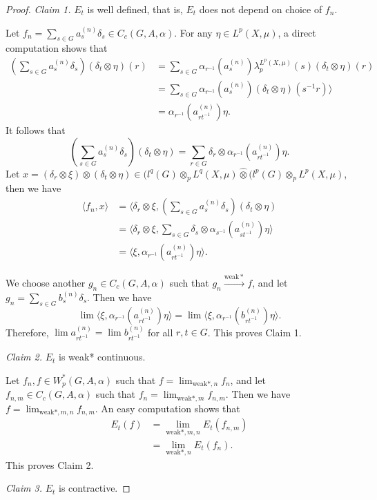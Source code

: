 \documentclass[reqno,11pt]{amsart}
\theoremstyle{plain}
\theoremstyle{definition}
\theoremstyle{remark}
\newcommand{\la}{\langle}
\newcommand{\ra}{\rangle}
\begin{document}
\begin{proof}
{\it Claim 1.} $E_t$ is well defined, that is, $E_t$ does not depend on choice of $f_n$.

Let $f_n=\sum_{s\in G}a_s^{(n)}\delta_s\in C_c(G,A,\alpha)$.
For any $\eta\in L^p(X,\mu)$, a direct computation shows that
$$\begin{aligned} (\sum_{s\in G} a_s^{(n)}\delta_s)(\delta_t\otimes \eta)(r)
 &=\sum_{s\in G}\alpha_{r^{-1}}(a_s^{(n)})\lambda_p^{L^p(X,\mu)}(s)(\delta_t\otimes \eta)(r)\\
 &=\sum_{s\in G} \alpha_{r^{-1}}(a_s^{(n)}) (\delta_t\otimes \eta)(s^{-1}r)  \ra\\
 &=\alpha_{r^{-1}}(a_{rt^{-1}}^{(n)})\eta.\end{aligned}$$
It follows that $$(\sum_{s\in G} a_s^{(n)}\delta_s)(\delta_t\otimes \eta)=\sum_{r\in G}\delta_r\otimes \alpha_{r^{-1}}(a_{rt^{-1}}^{(n)})\eta.$$
Let $x=(\delta_r\otimes\xi)\otimes (\delta_t\otimes \eta)\in (l^q(G)\otimes_p L^q(X,\mu)\widehat{\otimes}(l^p(G)\otimes_p L^p(X,\mu)$, then we have
$$\begin{aligned} \la f_n,x\ra
 &=\la \delta_r\otimes \xi,(\sum_{s\in G}a_s^{(n)}\delta_s)(\delta_t\otimes\eta)\\
 &=\la \delta_r\otimes\xi,\sum_{s\in G}\delta_s\otimes \alpha_{s^{-1}}(a^{(n)}_{st^{-1}})\eta   \ra\\
 &=\la \xi,\alpha_{r^{-1}}(a^{(n)}_{rt^{-1}})\eta \ra. \end{aligned}$$


We choose another $g_n\in C_c(G,A,\alpha)$ such that $g_n\xrightarrow{\mathrm{weak}*}f$,  and let $g_n=\sum_{s\in G}b_s^{(n)}\delta_s$. Then we have
$$\lim\la \xi,\alpha_{r^{-1}}(a^{(n)}_{rt^{-1}})\eta \ra=\lim\la \xi, \alpha_{r^{-1}}(b^{(n)}_{rt^{-1}})\eta \ra.$$
Therefore, $\lim a^{(n)}_{rt^{-1}}=\lim b^{(n)}_{rt^{-1}}$ for all $r,t\in G$. This proves Claim 1.

{\it Claim 2.} $E_t$ is weak* continuous.

Let $f_n,f\in W^*_p(G,A,\alpha)$ such that $f=\lim_{\mathrm{weak}*,n} f_n$, and let $f_{n,m}\in C_c(G,A,\alpha)$ such that $f_n=\lim_{\mathrm{weak}*,m}f_{n,m}$. Then we have $f=\lim_{\mathrm{weak}*,m,n}f_{n,m}$. An easy computation shows that
$$\begin{aligned} E_t(f)
 &=\lim_{\mathrm{weak}*,m,n}E_t(f_{n,m})\\
 &=\lim_{\mathrm{weak}*,n}E_t(f_n). \end{aligned}$$
This proves Claim 2.

{\it Claim 3.} $E_t$ is contractive.


\end{proof}
\end{document}
